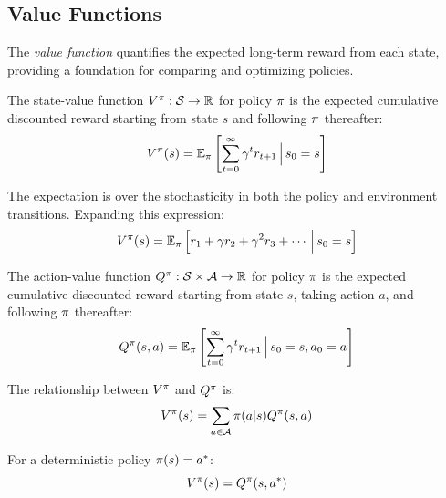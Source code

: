 \subsection{Value Functions}

The \textit{value function} quantifies the expected long-term reward from each state, providing a foundation for comparing and optimizing policies.

\begin{definition}
The state-value function $V^\pi: \mathcal{S} \rightarrow \mathbb{R}$ for policy $\pi$ is the expected cumulative discounted reward starting from state $s$ and following $\pi$ thereafter:
\begin{equation}
V^\pi(s) = \mathbb{E}_\pi \left[ \sum_{t=0}^{\infty} \gamma^t r_{t+1} \,\Big|\, s_0 = s \right]
\label{eq:value_function}
\end{equation}
\end{definition}

The expectation is over the stochasticity in both the policy and environment transitions. Expanding this expression:
\begin{equation}
V^\pi(s) = \mathbb{E}_\pi \left[ r_1 + \gamma r_2 + \gamma^2 r_3 + \cdots \,\Big|\, s_0 = s \right]
\end{equation}

\begin{definition}
The action-value function $Q^\pi: \mathcal{S} \times \mathcal{A} \rightarrow \mathbb{R}$ for policy $\pi$ is the expected cumulative discounted reward starting from state $s$, taking action $a$, and following $\pi$ thereafter:
\begin{equation}
Q^\pi(s, a) = \mathbb{E}_\pi \left[ \sum_{t=0}^{\infty} \gamma^t r_{t+1} \,\Big|\, s_0 = s, a_0 = a \right]
\label{eq:q_function}
\end{equation}
\end{definition}

The relationship between $V^\pi$ and $Q^\pi$ is:
\begin{equation}
V^\pi(s) = \sum_{a \in \mathcal{A}} \pi(a|s) Q^\pi(s, a)
\label{eq:v_q_relationship}
\end{equation}

For a deterministic policy $\pi(s) = a^*$:
\begin{equation}
V^\pi(s) = Q^\pi(s, a^*)
\end{equation}

